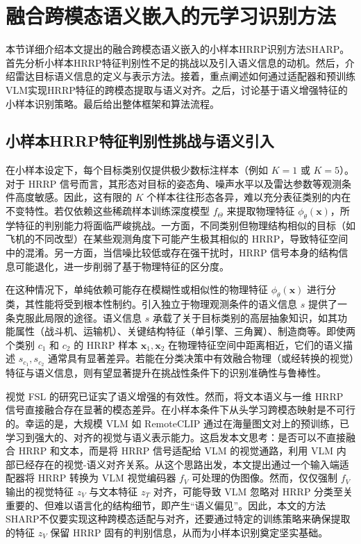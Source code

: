 \section{融合跨模态语义嵌入的元学习识别方法}
\label{sec:semantic_method}

本节详细介绍本文提出的融合跨模态语义嵌入的小样本HRRP识别方法SHARP。首先分析小样本HRRP特征判别性不足的挑战以及引入语义信息的动机。然后，介绍雷达目标语义信息的定义与表示方法。接着，重点阐述如何通过适配器和预训练VLM实现HRRP特征的跨模态提取与语义对齐。之后，讨论基于语义增强特征的小样本识别策略。最后给出整体框架和算法流程。

\subsection{小样本HRRP特征判别性挑战与语义引入}
\label{subsec:semantic_challenge}

在小样本设定下，每个目标类别仅提供极少数标注样本（例如 $K=1$ 或 $K=5$）。对于 HRRP 信号而言，其形态对目标的姿态角、噪声水平以及雷达参数等观测条件高度敏感。因此，这有限的 $K$ 个样本往往形态各异，难以充分表征类别的内在不变特性。若仅依赖这些稀疏样本训练深度模型 $f_\Theta$ 来提取物理特征 $\phi_\theta(\mathbf{x})$，所学特征的判别能力将面临严峻挑战。一方面，不同类别但物理结构相似的目标（如飞机的不同改型）在某些观测角度下可能产生极其相似的 HRRP，导致特征空间中的混淆。另一方面，当信噪比较低或存在强干扰时，HRRP 信号本身的结构信息可能退化，进一步削弱了基于物理特征的区分度。 

在这种情况下，单纯依赖可能存在模糊性或相似性的物理特征 $\phi_\theta(\mathbf{x})$ 进行分类，其性能将受到根本性制约。引入独立于物理观测条件的语义信息 $s$ 提供了一条克服此局限的途径。语义信息 $s$ 承载了关于目标类别的高层抽象知识，如其功能属性（战斗机、运输机）、关键结构特征（单引擎、三角翼）、制造商等。即使两个类别 $c_1$ 和 $c_2$ 的 HRRP 样本 $\mathbf{x}_1, \mathbf{x}_2$ 在物理特征空间中距离相近，它们的语义描述 $s_{c_1}, s_{c_2}$ 通常具有显著差异。若能在分类决策中有效融合物理（或经转换的视觉）特征与语义信息，则有望显著提升在挑战性条件下的识别准确性与鲁棒性。 

视觉 FSL 的研究已证实了语义增强的有效性。然而，将文本语义与一维 HRRP 信号直接融合存在显著的模态差异。在小样本条件下从头学习跨模态映射是不可行的。幸运的是，大规模 VLM 如 RemoteCLIP 通过在海量图文对上的预训练，已学习到强大的、对齐的视觉与语义表示能力。这启发本文思考：是否可以不直接融合 HRRP 和文本，而是将 HRRP 信号适配给 VLM 的视觉通路，利用 VLM 内部已经存在的视觉-语义对齐关系。从这个思路出发，本文提出通过一个输入端适配器将 HRRP 转换为 VLM 视觉编码器 $f_V$ 可处理的伪图像。然而，仅仅强制 $f_V$ 输出的视觉特征 $z_V$ 与文本特征 $z_T$ 对齐，可能导致 VLM 忽略对 HRRP 分类至关重要的、但难以语言化的结构细节，即产生“语义偏见”。因此，本文的方法SHARP不仅要实现这种跨模态适配与对齐，还要通过特定的训练策略来确保提取的特征 $z_V$ 保留 HRRP 固有的判别信息，从而为小样本识别奠定坚实基础。

